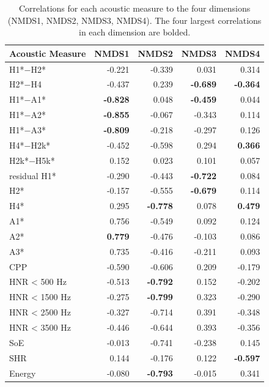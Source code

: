 \begin{table}[ht]
    \centering
    \caption{Correlations for each acoustic measure to the four dimensions (NMDS1, NMDS2, NMDS3, NMDS4). The four largest correlations in each dimension are bolded.} 
    \label{tab:acoustic_correlates}
    \begin{tabular}{lrrrr}
        \lsptoprule
        Acoustic Measure & NMDS1 & NMDS2 & NMDS3 & NMDS4 \\ 
        \hline
        H1*$-$H2* & -0.221 & -0.339 & 0.031 & 0.314 \\ 
        H2*$-$H4 & -0.437 & 0.239 & \textbf{-0.689} & \textbf{-0.364} \\ 
        H1*$-$A1* & \textbf{-0.828} & 0.048 & \textbf{-0.459} & 0.044 \\ 
        H1*$-$A2* & \textbf{-0.855} & -0.067 & -0.343 & 0.114 \\ 
        H1*$-$A3* & \textbf{-0.809} & -0.218 & -0.297 & 0.126 \\ 
        H4*$-$H2k* & -0.452 & -0.598 & 0.294 & \textbf{0.366} \\ 
        H2k*$-$H5k* & 0.152 & 0.023 & 0.101 & 0.057 \\ 
        residual H1* & -0.290 & -0.443 & \textbf{-0.722} & 0.084 \\ 
        H2* & -0.157 & -0.555 & \textbf{-0.679} & 0.114 \\ 
        H4* & 0.295 & \textbf{-0.778} & 0.078 & \textbf{0.479} \\ 
        A1* & 0.756 & -0.549 & 0.092 & 0.124 \\ 
        A2* & \textbf{0.779} & -0.476 & -0.103 & 0.086 \\ 
        A3* & 0.735 & -0.416 & -0.211 & 0.093 \\ 
        CPP & -0.590 & -0.606 & 0.209 & -0.179 \\ 
        HNR < 500 Hz & -0.513 & \textbf{-0.792} & 0.152 & -0.202 \\ 
        HNR < 1500 Hz & -0.275 & \textbf{-0.799} & 0.323 & -0.290 \\ 
        HNR < 2500 Hz & -0.327 & -0.714 & 0.391 & -0.348 \\ 
        HNR < 3500 Hz & -0.446 & -0.644 & 0.393 & -0.356 \\ 
        SoE & -0.013 & -0.741 & -0.238 & 0.145 \\ 
        SHR & 0.144 & -0.176 & 0.122 & \textbf{-0.597} \\ 
        Energy & -0.080 & \textbf{-0.793} & -0.015 & 0.341 \\ 

\end{tabular}
\end{table}
